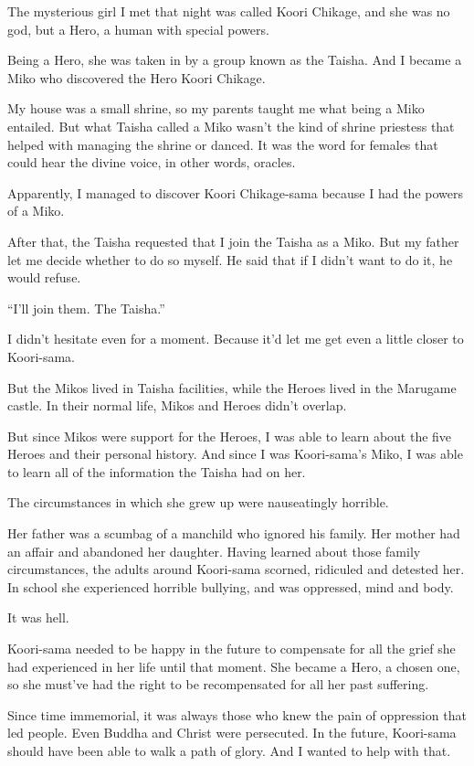 The mysterious girl I met that night was called Koori Chikage, and she was no god, but a Hero, a human with special powers.

Being a Hero, she was taken in by a group known as the Taisha. And I became a Miko who discovered the Hero Koori Chikage.

My house was a small shrine, so my parents taught me what being a Miko entailed. But what Taisha called a Miko wasn't the kind of shrine priestess that helped with managing the shrine or danced. It was the word for females that could hear the divine voice, in other words, oracles.

Apparently, I managed to discover Koori Chikage-sama because I had the powers of a Miko.

After that, the Taisha requested that I join the Taisha as a Miko. But my father let me decide whether to do so myself. He said that if I didn't want to do it, he would refuse.

``I'll join them. The Taisha.''

I didn't hesitate even for a moment. Because it'd let me get even a little closer to Koori-sama.

But the Mikos lived in Taisha facilities, while the Heroes lived in the Marugame castle. In their normal life, Mikos and Heroes didn't overlap.

But since Mikos were support for the Heroes, I was able to learn about the five Heroes and their personal history. And since I was Koori-sama's Miko, I was able to learn all of the information the Taisha had on her.

The circumstances in which she grew up were nauseatingly horrible.

Her father was a scumbag of a manchild who ignored his family. Her mother had an affair and abandoned her daughter. Having learned about those family circumstances, the adults around Koori-sama scorned, ridiculed and detested her. In school she experienced horrible bullying, and was oppressed, mind and body.

It was hell.

Koori-sama needed to be happy in the future to compensate for all the grief she had experienced in her life until that moment. She became a Hero, a chosen one, so she must've had the right to be recompensated for all her past suffering.

Since time immemorial, it was always those who knew the pain of oppression that led people. Even Buddha and Christ were persecuted. In the future, Koori-sama should have been able to walk a path of glory. And I wanted to help with that.

